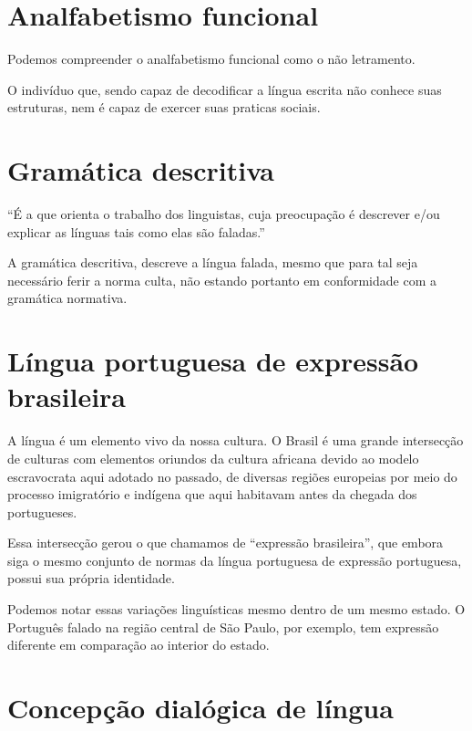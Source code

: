 \documentclass[
	12pt,				%
	openright,			%
	oneside,			%
	a4paper,			%
	english,			%
	french,				%
	spanish,			%
	brazil				%
	]{abntex2}
\begin{document}
\section{Analfabetismo funcional}
Podemos compreender o analfabetismo funcional como o não letramento.

\par

O indivíduo que, sendo capaz de decodificar a língua escrita
não conhece suas estruturas, nem é capaz de exercer suas praticas
sociais.

\section{Gramática descritiva}
``É a que orienta o trabalho dos linguistas, cuja preocupação é
descrever e/ou explicar as línguas tais como elas são faladas.''
\hbox{\cite{possenti}}

\par

A gramática descritiva, descreve a língua falada, mesmo que para
tal seja necessário ferir a norma culta, não estando portanto
em conformidade com a gramática normativa.

\section{Língua portuguesa de expressão brasileira}
A língua é um elemento vivo da nossa cultura. O Brasil é uma
grande intersecção de culturas com elementos oriundos da
cultura africana devido ao modelo escravocrata aqui adotado no passado,
de diversas regiões europeias por meio do processo imigratório e indígena
que aqui habitavam antes da chegada dos portugueses.

\par

Essa intersecção gerou o que chamamos de ``expressão brasileira'',
que embora siga o mesmo conjunto de normas da língua portuguesa de
expressão portuguesa, possui sua própria identidade.
\par

Podemos notar essas variações linguísticas mesmo dentro de um mesmo
estado. O Português falado na região central de São Paulo, por exemplo,
tem expressão diferente em comparação ao interior do estado.

\section{Concepção dialógica de língua}
\end{document}
